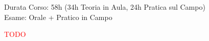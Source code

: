 \documentclass[../uefaC.tex]{subfiles}
\begin{document}
\onlyinsubfile{\maketitle}

\onlyinsubfile{}

\onlyinsubfile{\tableofcontents}


Durata Corso: 58h (34h Teoria in Aula, 24h Pratica sul Campo) \hfill \\
Esame: Orale + Pratico in Campo

\textcolor{red}{TODO}
\end{document}
